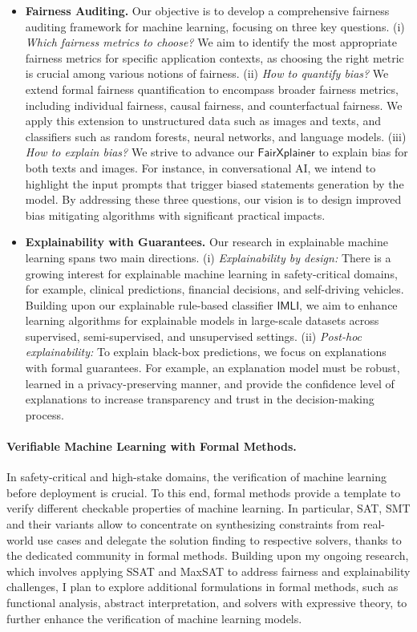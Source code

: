 \documentclass[10pt]{article}
\begin{document}
	 	\begin{itemize}
	 		\item \textbf{Fairness Auditing.}
	 		Our objective is to develop a comprehensive fairness auditing framework for machine learning, focusing on three key questions. (i) \textit{Which fairness metrics to choose?} We aim to identify the most appropriate fairness metrics for specific application contexts, as choosing the right metric is crucial among various notions of fairness. (ii) \textit{How to quantify bias?} We extend formal fairness quantification to encompass broader fairness metrics, including individual fairness, causal fairness, and counterfactual fairness. We apply this extension to
	 		 unstructured data such as images and texts, and classifiers such as random forests, neural networks, and language models.  (iii) \textit{How to explain bias?}  We strive to advance our $\mathsf{FairXplainer}$ to explain bias for both texts and images. For instance, in conversational AI, we intend to highlight the input prompts that trigger biased statements generation by the model. By addressing these three questions, our vision is to design improved bias mitigating algorithms with significant practical impacts.
	 		 
	 		 \item \textbf{Explainability with Guarantees.} Our research in explainable machine learning spans two main directions.  (i) \textit{Explainability by design:} There is a growing interest for explainable machine learning in safety-critical domains, for example, clinical predictions, financial decisions, and self-driving vehicles. Building upon our explainable rule-based classifier $ \mathsf{IMLI} $, we aim to enhance learning algorithms for explainable models in large-scale datasets across supervised, semi-supervised, and unsupervised settings. (ii) \textit{Post-hoc explainability:} To explain black-box predictions, we focus on explanations with formal guarantees. For example, an explanation model must be robust, learned in a privacy-preserving manner, and provide the confidence level of explanations to increase transparency and trust in the decision-making process.
	 	\end{itemize}
	 	
	 	
	 
		\paragraph{Verifiable Machine Learning with Formal Methods.} In safety-critical and high-stake domains, the verification of machine learning before deployment is crucial. To this end, formal methods provide a template to verify different checkable properties of machine learning. In particular, SAT, SMT and their variants allow to concentrate on synthesizing constraints from real-world use cases and delegate the solution finding to respective solvers, thanks to the dedicated community in formal methods. Building upon my ongoing research, which involves applying SSAT and MaxSAT to address fairness and explainability challenges, I plan to explore additional formulations in formal methods, such as functional analysis, abstract interpretation, and solvers with expressive theory, to further enhance the verification of machine learning models.
	
\end{document}
